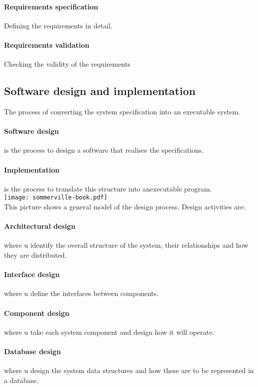 \documentclass[a4paper,11pt,twocolumn]{report}
\begin{document}
    \paragraph{Requirements specification} Defining the requirements in detail.
    \paragraph{Requirements validation} Checking the validity of the
    requirements
    \subsection{Software design and implementation}
    The process of converting the system specification into an executable
    system.
    \paragraph{Software design} is the process to design a software that
    realises the specifications.
    \paragraph{Implementation} is the process to translate this structure into
    anexecutable program.\\
    \texttt{[image: sommerville-book.pdf]}\\
    This picture shows a general model of the design process. Design activities
    are:
    \paragraph{Architectural design} where u identify the overall structure of
    the system, their relationships and how they are distributed.
    \paragraph{Interface design} where u define the interfaces between
    components.
    \paragraph{Component design} where u take each system component and design
    how it will operate.
    \paragraph{Database design} where u design the system data structures and
    how these are to be represented in a database.
\end{document}

